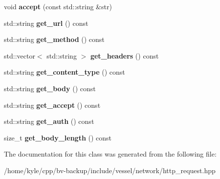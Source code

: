 \begin{DoxyCompactItemize}
void {\bfseries accept} (const std\+::string \&str)
\item 
\mbox{\label{class_vessel_1_1_networking_1_1_http_request_aa50f669749dc7684b43fa80b03a4cea5}} 
std\+::string {\bfseries get\+\_\+url} () const
\item 
\mbox{\label{class_vessel_1_1_networking_1_1_http_request_ae87d59bf82a8dfb1d7fdbe5526933dbe}} 
std\+::string {\bfseries get\+\_\+method} () const
\item 
\mbox{\label{class_vessel_1_1_networking_1_1_http_request_a88b4b723f7a700b3a31239a2a5c1bf52}} 
std\+::vector$<$ std\+::string $>$ {\bfseries get\+\_\+headers} () const
\item 
\mbox{\label{class_vessel_1_1_networking_1_1_http_request_ace6fc0a7eed46ad501e9afdec4874cfc}} 
std\+::string {\bfseries get\+\_\+content\+\_\+type} () const
\item 
\mbox{\label{class_vessel_1_1_networking_1_1_http_request_a9d1a4115eb3eb1866bad739b0e9b0c3c}} 
std\+::string {\bfseries get\+\_\+body} () const
\item 
\mbox{\label{class_vessel_1_1_networking_1_1_http_request_af117db81f197b8cca5776e7c1c072aab}} 
std\+::string {\bfseries get\+\_\+accept} () const
\item 
\mbox{\label{class_vessel_1_1_networking_1_1_http_request_a81fa60d4bc862883aae195414880f9bd}} 
std\+::string {\bfseries get\+\_\+auth} () const
\item 
\mbox{\label{class_vessel_1_1_networking_1_1_http_request_ac1ce8c49c62282b69f9cb4180e3d2e50}} 
size\+\_\+t {\bfseries get\+\_\+body\+\_\+length} () const
\end{DoxyCompactItemize}


The documentation for this class was generated from the following file\+:\begin{DoxyCompactItemize}
\item 
/home/kyle/cpp/bv-\/backup/include/vessel/network/http\+\_\+request.\+hpp\end{DoxyCompactItemize}
